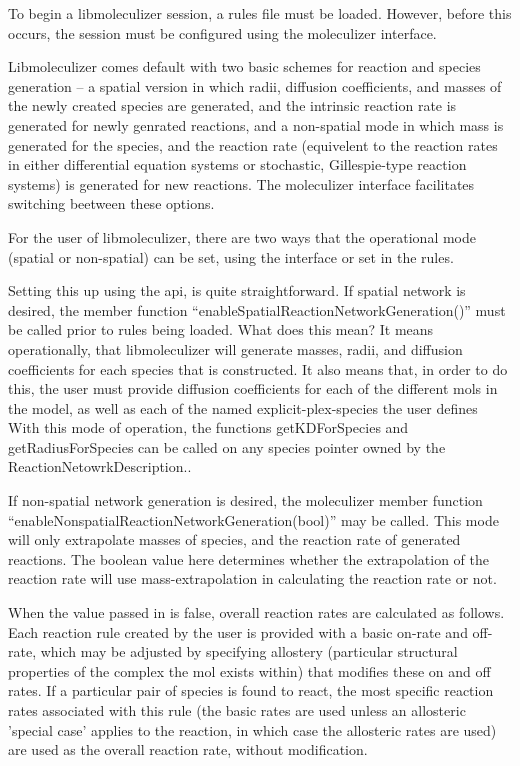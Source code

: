 To begin a libmoleculizer session, a rules file must be loaded.
However, before this occurs, the session must be configured using the
moleculizer interface.

Libmoleculizer comes default with two basic schemes for reaction and
species generation -- a spatial version in which radii,  diffusion
coefficients, and masses of the newly created species are generated, and the
intrinsic reaction rate is generated for newly genrated reactions, and
a non-spatial mode in which mass is generated for the species, and the
reaction rate (equivelent to the reaction rates in either differential
equation systems or stochastic, Gillespie-type reaction systems) is
generated for new reactions.  The moleculizer interface facilitates
switching beetween these options.

For the user of libmoleculizer, there are two ways that the
operational mode (spatial or non-spatial) can be set, using the
interface or set in the rules.  

Setting this up using the api, is quite straightforward.  If spatial
network is desired, the member function
``enableSpatialReactionNetworkGeneration()'' must be called prior to
rules being loaded.  What does this mean?  It means operationally,
that libmoleculizer will generate masses, radii, and diffusion
coefficients for each species that is constructed.  It also means
that, in order to do this, the user must provide diffusion
coefficients for each of the different mols in the model, as well as
each of the named explicit-plex-species the user defines  With this
mode of operation, the functions getKDForSpecies and
getRadiusForSpecies can be called on any species pointer owned by the
ReactionNetowrkDescription..

If non-spatial network generation is desired, the moleculizer member
function ``enableNonspatialReactionNetworkGeneration(bool)'' may be
called.  This mode will only extrapolate masses of species, and the
reaction rate of generated reactions.  The boolean value here
determines whether the extrapolation of the reaction rate will use
mass-extrapolation in calculating the reaction rate or not.  

When the value passed in is false, overall reaction rates are
calculated as follows.  Each reaction rule created by the user is
provided with a basic on-rate and off-rate, which may be adjusted by
specifying allostery (particular structural properties of the complex
the mol exists within) that modifies these on and off rates.  If a
particular pair of species is found to react, the most specific
reaction rates associated with this rule (the basic rates are used
unless an allosteric 'special case' applies to the reaction, in which
case the allosteric rates are used) are used as the overall reaction
rate, without modification.

